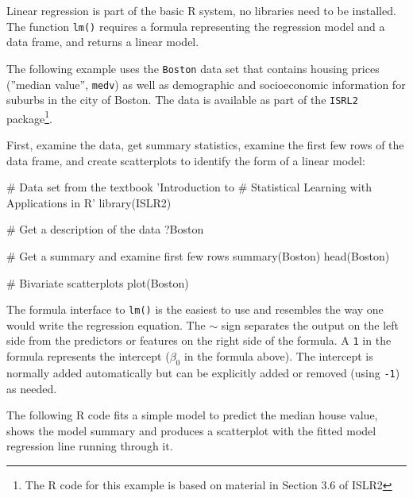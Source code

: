Linear regression is part of the basic R system, no libraries need to be installed. The function \texttt{lm()} requires a formula representing the regression model and a data frame, and returns a linear model. 

The following example uses the \texttt{Boston} data set that contains housing prices (''median value'', \texttt{medv}) as well as demographic and socioeconomic information for suburbs in the city of Boston. The data is available as part of the \texttt{ISRL2} package\footnote{The R code for this example is based on material in Section 3.6 of ISLR2}.

First, examine the data, get summary statistics, examine the first few rows of the data frame, and create scatterplots to identify the form of a linear model:

\begin{samepage}
\begin{Rcode}
# Data set from the textbook 'Introduction to 
# Statistical Learning with Applications in R'
library(ISLR2)

# Get a description of the data
?Boston

# Get a summary and examine first few rows
summary(Boston)
head(Boston)

# Bivariate scatterplots
plot(Boston)
\end{Rcode}
\end{samepage}

The formula interface to \texttt{lm()} is the easiest to use and resembles the way one would write the regression equation. The $\sim$ sign separates the output on the left side from the predictors or features on the right side of the formula. A \texttt{1} in the formula represents the intercept ($\beta_0$ in the formula above). The intercept is normally added automatically but can be explicitly added or removed (using \texttt{-1}) as needed. 

The following R code fits a simple model to predict the median house value, shows the model summary and produces a scatterplot with the fitted model regression line running through it. 

